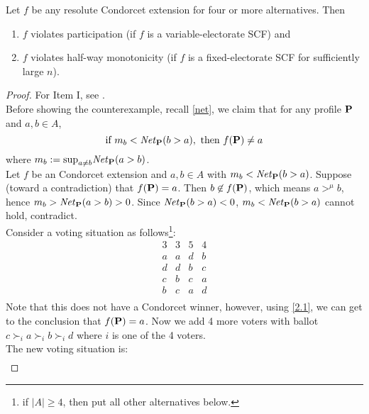 \begin{theorem}
    \label{conext}
    Let $f$ be any resolute Condorcet extension for four or more alternatives. Then
    \begin{enumerate}
        \item $f$ violates participation (if $f$ is a variable-electorate SCF) and
        \item $f$ violates half-way monotonicity (if $f$ is a fixed-electorate SCF for sufficiently large $n$).
    \end{enumerate}
\end{theorem}

\begin{proof}
    For Item I, see \textcite{moulinCondorcetPrincipleImplies1988}. \\
    Before showing the counterexample, recall \cref{net}, we claim that for any profile $\profile$ and $a, b \in A$, 
    \begin{equation}
        \label{2.1}
        \mbox{if } m_b < \mathit{Net}_{\mathbf{P}}(b>a),\ \mbox{then } f(\mathbf{P}) \neq a
    \end{equation}
    where $m_b := \text{sup}_{a \neq b} \mathit{Net}_\profile(a>b)$.\\
    Let $f$ be an Condorcet extension and $a,b \in A$ with $m_b < \mathit{Net}_\profile(b>a)$. Suppose (toward a contradiction) that $f(\profile) = a$. Then $b \not \in f(\profile)$, which means $a >^\mu b$, hence $m_b > \mathit{Net}_\profile(a>b) > 0$. Since $\mathit{Net}_\profile(b > a) < 0$, $m_b < \mathit{Net}_\profile(b>a)$ cannot hold, contradict.\\
    Consider a voting situation as follows\footnote{if $|A| \geq 4$, then put all other alternatives below.}:
    $$\begin{array}{cccc}
        3 & 3 & 5 & 4\\
        \hline
        a & a & d & b \\
        d & d & b & c \\
        c & b & c & a \\
        b & c & a & d \\
    \end{array}$$
    Note that this does not have a Condorcet winner, however, using \ref{2.1}, we can get to the conclusion that $f(\profile) = a$. Now we add 4 more voters with ballot $c \succ_i a \succ_i b \succ_i d$ where $i$ is one of the 4 voters.\\
    The new voting situation is:
    $$\begin{array}{ccccc}

\end{array}$$
\end{proof}
